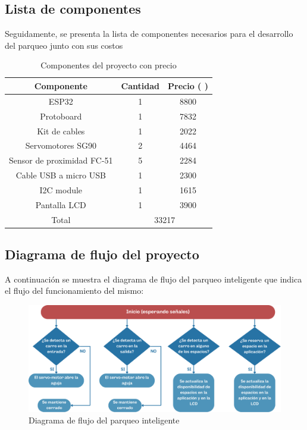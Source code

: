 \documentclass[12pt,a4paper]{article}
\DeclareRobustCommand{\Colon}{{%
  \ooalign{%
    \hidewidth\raisebox{0.2ex}{/}\kern0.1em\hidewidth\cr
    C\cr
    \hidewidth\kern0.1em\raisebox{0.2ex}{/}\hidewidth\cr
  }%
}}
\begin{document}
\subsection{Lista de componentes}
Seguidamente, se presenta la lista de componentes necesarios para el desarrollo del parqueo junto con sus costos
\begin{table}[H]
\centering
\begin{tabular}{|c|cc|}
\hline
\textbf{Componente} & \multicolumn{1}{c|}{\textbf{Cantidad}} & \textbf{Precio (\Colon)} \\ \hline
ESP32 & \multicolumn{1}{c|}{1} & 8800 \\ \hline
Protoboard & \multicolumn{1}{c|}{1} & 7832 \\ \hline
Kit de cables & \multicolumn{1}{c|}{1} & 2022 \\ \hline
Servomotores SG90 & \multicolumn{1}{c|}{2} & 4464 \\ \hline
Sensor de proximidad FC-51 & \multicolumn{1}{c|}{5} & 2284 \\ \hline
Cable USB a micro USB & \multicolumn{1}{c|}{1} & 2300 \\ \hline
I2C module & \multicolumn{1}{c|}{1} & 1615 \\ \hline
Pantalla LCD & \multicolumn{1}{c|}{1} & 3900 \\ \hline
Total & \multicolumn{2}{c|}{33217} \\ \hline
\end{tabular}
\caption{Componentes del proyecto con precio}
\label{tab:componentes}
\end{table}

\subsection{Diagrama de flujo del proyecto}
A continuación se muestra el diagrama de flujo del parqueo inteligente que indica el flujo del funcionamiento del mismo:
\begin{figure}[H]
    \centering
    \includegraphics[width=0.9\linewidth]{Imagenes/flow.png}
    \caption{Diagrama de flujo del parqueo inteligente}
    \label{fig:6}
\end{figure}
\end{document}
